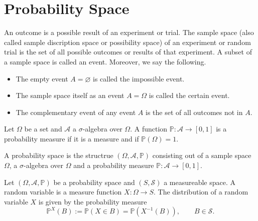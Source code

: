 \section{Probability Space}

\begin{definition}
    An outcome is a possible result of an experiment or trial. The sample space (also called sample discription space or possibility space) of an experiment or random trial is the set of all possible outcomes or results of that experiment. A subset of a sample space is called an event. Moreover, we say the following.
    \begin{itemize}
        \item The empty event \(A = \varnothing\) is called the impossible event.
        \item The sample space itself as an event \(A = \Omega\) is called the certain event.
        \item The complementary event of any event \(A\) is the set of all outcomes not in \(A\).
    \end{itemize}
\end{definition}

\begin{definition}
    Let \(\Omega\) be a set and \(\mathcal{A}\) a \(\sigma\)-algebra over \(\Omega\). A function \(\mathbb{P}: \mathcal{A} \rightarrow [0, 1]\) is a probability measure if it is a measure and if \(\mathbb{P}(\Omega) = 1\).
\end{definition}

\begin{definition}
    A probability space is the structrue \((\Omega, \mathcal{A}, \mathbb{P})\) consisting out of a sample space \(\Omega\), a \(\sigma\)-algebra over \(\Omega\) and a probability measure \(\mathbb{P}: \mathcal{A} \rightarrow [0, 1]\).
\end{definition}

\begin{definition}
    Let \((\Omega, \mathcal{A}, \mathbb{P})\) be a probability space and \((S, \mathcal{S})\) a measureable space. A random variable is a measure function \(X: \Omega \rightarrow S\). The distribution of a random variable \(X\) is given by the probability measure
    \begin{equation}
        \mathbb{P}^X (B) := \mathbb{P}(X \in B) = \mathbb{P}(X^{-1} (B)), \qquad B \in \mathcal{S} \text{.}
    \end{equation}
\end{definition}